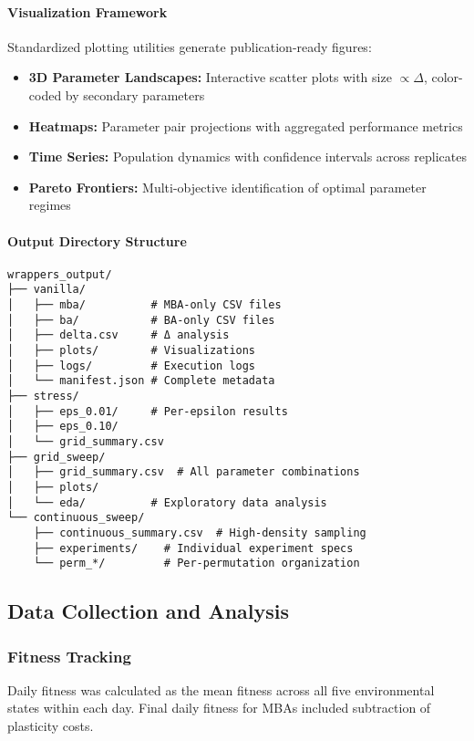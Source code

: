 \documentclass[aps,pre,twocolumn,floatfix,nofootinbib,amsmath,amssymb]{revtex4-2}
\begin{document}
\paragraph{Visualization Framework}
Standardized plotting utilities generate publication-ready figures:

\begin{itemize}
\item \textbf{3D Parameter Landscapes:} Interactive scatter plots with size $\propto \Delta$, color-coded by secondary parameters
\item \textbf{Heatmaps:} Parameter pair projections with aggregated performance metrics
\item \textbf{Time Series:} Population dynamics with confidence intervals across replicates
\item \textbf{Pareto Frontiers:} Multi-objective identification of optimal parameter regimes
\end{itemize}

\paragraph{Output Directory Structure}
\begin{verbatim}
wrappers_output/
├── vanilla/
│   ├── mba/          # MBA-only CSV files
│   ├── ba/           # BA-only CSV files  
│   ├── delta.csv     # Δ analysis
│   ├── plots/        # Visualizations
│   ├── logs/         # Execution logs
│   └── manifest.json # Complete metadata
├── stress/
│   ├── eps_0.01/     # Per-epsilon results
│   ├── eps_0.10/
│   └── grid_summary.csv
├── grid_sweep/
│   ├── grid_summary.csv  # All parameter combinations
│   ├── plots/
│   └── eda/          # Exploratory data analysis
└── continuous_sweep/
    ├── continuous_summary.csv  # High-density sampling
    ├── experiments/    # Individual experiment specs
    └── perm_*/         # Per-permutation organization
\end{verbatim}

\subsection{Data Collection and Analysis}

\subsubsection{Fitness Tracking}
Daily fitness was calculated as the mean fitness across all five environmental states within each day. Final daily fitness for MBAs included subtraction of plasticity costs.
\end{document}
